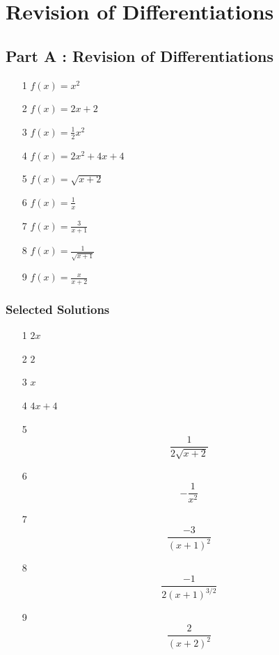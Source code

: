 \documentclass[]{article}
\begin{document}
	\section*{Revision of Differentiations}
	\Large



\subsection*{Part A : Revision of Differentiations}
{
\Large
\begin{multicols}{2}
\begin{itemize}
	\item[1] $ f(x) = x^2  $ \,
	\item[2] $ f(x) = 2x + 2  $ \,
	\item[3] $ f(x) = \frac{1}{2}x^2  $ \,
	\item[4] $ f(x) = 2x^2 + 4x + 4  $ \,
	\item[5] $ f(x) = \sqrt{x+2}  $ \,
	\item[6] $ f(x) = \frac{1}{x}  $ \,
	\item[7] $ f(x) = \frac{3}{x+1}  $ \,
	\item[8] $ f(x) = \frac{1}{\sqrt{x+1}}  $ \,
	\item[9] $ f(x) = \frac{x}{x+2}  $ \,
\end{itemize}
\end{multicols}
}
	\subsubsection*{Selected Solutions}
	\begin{framed}	
		\Large
		\begin{multicols}{2}
			\begin{enumerate}
				\item[1]	\qquad	 $ 2x$			\item[2]	\qquad	 $2$
				\item[3]	\qquad	 $ x$
				\item[4]	\qquad	 $ 4x+4$ \\
				\item[5]		 \[ \frac{1}{2\sqrt{x+2}}\]
				\item[6]		 \[ -\frac{1}{x^2}\]
				\item[7]		 \[ \frac{-3}{(x+1)^2}\]
				\item[8] \[\frac{-1}{2(x+1)^{3/2}}\]
				\item[9]		\[\frac{2}{(x+2)^2}\]
			\end{enumerate}
		\end{multicols}
	\end{framed}
	\newpage
	
\end{document}
